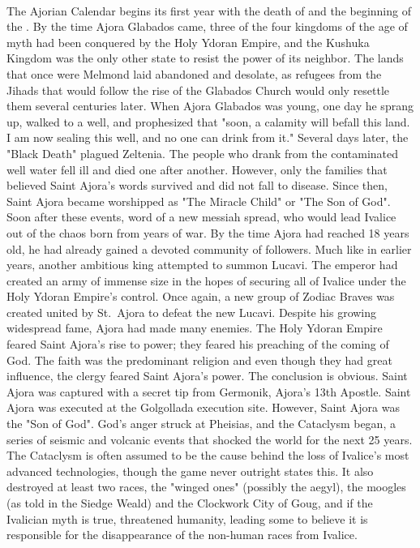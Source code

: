 \ofpar
%
\\
The Ajorian Calendar begins its first year with the death of  and the beginning of the . 
By the time Ajora Glabados came, three of the four kingdoms of the age of myth had been conquered by the Holy Ydoran Empire, and the Kushuka Kingdom was the only other state to resist the power of its neighbor. 
The lands that once were Melmond laid abandoned and desolate, as refugees from the Jihads that would follow the rise of the Glabados Church would only resettle them several centuries later.
When Ajora Glabados was young, one day he sprang up, walked to a well, and prophesized that "soon, a calamity will befall this land. 
I am now sealing this well, and no one can drink from it." Several days later, the "Black Death" plagued Zeltenia. 
The people who drank from the contaminated well water fell ill and died one after another.
However, only the families that believed Saint Ajora's words survived and did not fall to disease. 
Since then, Saint Ajora became worshipped as "The Miracle Child" or "The Son of God".
Soon after these events, word of a new messiah spread, who would lead Ivalice out of the chaos born from years of war. 
By the time Ajora had reached 18 years old, he had already gained a devoted community of followers. 
Much like in earlier years, another ambitious king attempted to summon Lucavi. 
The emperor had created an army of immense size in the hopes of securing all of Ivalice under the Holy Ydoran Empire’s control. 
Once again, a new group of Zodiac Braves was created united by St.~Ajora to defeat the new Lucavi.
Despite his growing widespread fame, Ajora had made many enemies. 
The Holy Ydoran Empire feared Saint Ajora's rise to power; they feared his preaching of the coming of God. 
The  faith was the predominant religion and even though they had great influence, the clergy feared Saint Ajora's power. 
The conclusion is obvious.
Saint Ajora was captured with a secret tip from Germonik, Ajora's 13th Apostle. 
Saint Ajora was executed at the Golgollada execution site. 
However, Saint Ajora was the "Son of God". 
God's anger struck at Pheisias, and the Cataclysm began, a series of seismic and volcanic events that shocked the world for the next 25 years.
The Cataclysm is often assumed to be the cause behind the loss of Ivalice's most advanced technologies, though the game never outright states this. 
It also destroyed at least two races, the "winged ones" (possibly the aegyl), the moogles (as told in the Siedge Weald) and the Clockwork City of Goug, and if the Ivalician myth is true, threatened humanity, leading some to believe it is responsible for the disappearance of the non-human races from Ivalice. 
